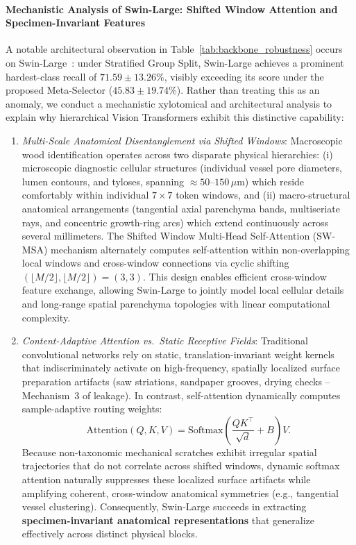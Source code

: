 \documentclass[a4paper,fleqn]{cas-sc}
\begin{document}
\paragraph{Mechanistic Analysis of Swin-Large: Shifted Window Attention and Specimen-Invariant Features}
A notable architectural observation in Table~\ref{tab:backbone_robustness} occurs on Swin-Large~\cite{swin}: under \textsf{Stratified Group Split}, Swin-Large achieves a prominent hardest-class recall of $71.59 \pm 13.26\%$, visibly exceeding its score under the proposed Meta-Selector ($45.83 \pm 19.74\%$). Rather than treating this as an anomaly, we conduct a mechanistic xylotomical and architectural analysis to explain why hierarchical Vision Transformers exhibit this distinctive capability:
\begin{enumerate}
\item \emph{Multi-Scale Anatomical Disentanglement via Shifted Windows}: Macroscopic wood identification operates across two disparate physical hierarchies: (i) microscopic diagnostic cellular structures (individual vessel pore diameters, lumen contours, and tyloses, spanning $\approx 50$--$150\,\mu\text{m}$) which reside comfortably within individual $7 \times 7$ token windows, and (ii) macro-structural anatomical arrangements (tangential axial parenchyma bands, multiseriate rays, and concentric growth-ring arcs) which extend continuously across several millimeters. The Shifted Window Multi-Head Self-Attention (SW-MSA) mechanism alternately computes self-attention within non-overlapping local windows and cross-window connections via cyclic shifting $(\lfloor M/2 \rfloor, \lfloor M/2 \rfloor) = (3, 3)$. This design enables efficient cross-window feature exchange, allowing Swin-Large to jointly model local cellular details and long-range spatial parenchyma topologies with linear computational complexity.
\item \emph{Content-Adaptive Attention vs.\ Static Receptive Fields}: Traditional convolutional networks rely on static, translation-invariant weight kernels that indiscriminately activate on high-frequency, spatially localized surface preparation artifacts (saw striations, sandpaper grooves, drying checks -- Mechanism~3 of leakage). In contrast, self-attention dynamically computes sample-adaptive routing weights:
\begin{equation}
\mathrm{Attention}(Q, K, V) = \mathrm{Softmax}\left( \frac{Q K^\top}{\sqrt{d}} + B \right) V.
\end{equation}
Because non-taxonomic mechanical scratches exhibit irregular spatial trajectories that do not correlate across shifted windows, dynamic softmax attention naturally suppresses these localized surface artifacts while amplifying coherent, cross-window anatomical symmetries (e.g., tangential vessel clustering). Consequently, Swin-Large succeeds in extracting \textbf{specimen-invariant anatomical representations} that generalize effectively across distinct physical blocks.

\end{enumerate}
\end{document}
